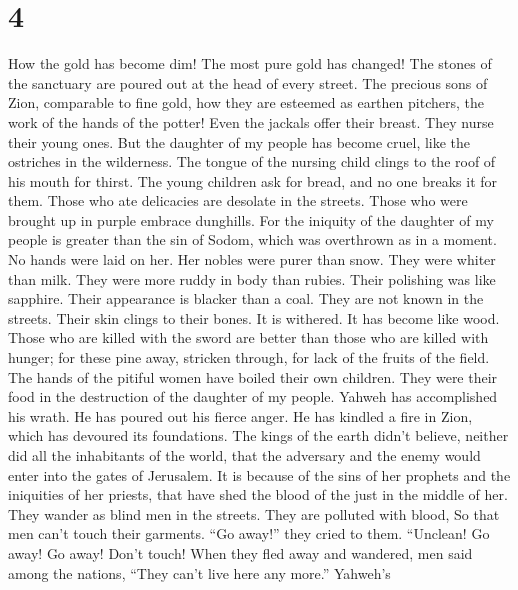 \hypertarget{section-3}{%
\section{4}\label{section-3}}

 How the gold has become dim! The most pure gold has
changed! The stones of the sanctuary are poured out at the head of every
street.  The precious sons of Zion, comparable to fine
gold, how they are esteemed as earthen pitchers, the work of the hands
of the potter!  Even the jackals offer their breast. They
nurse their young ones. But the daughter of my people has become cruel,
like the ostriches in the wilderness.  The tongue of the
nursing child clings to the roof of his mouth for thirst. The young
children ask for bread, and no one breaks it for them. 
Those who ate delicacies are desolate in the streets. Those who were
brought up in purple embrace dunghills.  For the iniquity
of the daughter of my people is greater than the sin of Sodom, which was
overthrown as in a moment. No hands were laid on her.  Her
nobles were purer than snow. They were whiter than milk. They were more
ruddy in body than rubies. Their polishing was like sapphire.
 Their appearance is blacker than a coal. They are not
known in the streets. Their skin clings to their bones. It is withered.
It has become like wood.  Those who are killed with the
sword are better than those who are killed with hunger; for these pine
away, stricken through, for lack of the fruits of the field.
 The hands of the pitiful women have boiled their own
children. They were their food in the destruction of the daughter of my
people.  Yahweh has accomplished his wrath. He has poured
out his fierce anger. He has kindled a fire in Zion, which has devoured
its foundations.  The kings of the earth didn't believe,
neither did all the inhabitants of the world, that the adversary and the
enemy would enter into the gates of Jerusalem.  It is
because of the sins of her prophets and the iniquities of her priests,
that have shed the blood of the just in the middle of her.
 They wander as blind men in the streets. They are
polluted with blood, So that men can't touch their garments.
 ``Go away!'' they cried to them. ``Unclean! Go away! Go
away! Don't touch! When they fled away and wandered, men said among the
nations, ``They can't live here any more.''  Yahweh's
